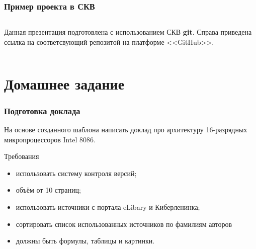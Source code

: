 \documentclass[aspectratio=169]{beamer}
\begin{document}
\begin{frame}
\frametitle{Пример проекта в СКВ}
\medskip
\begin{columns}
Данная презентация подготовлена с использованием СКВ \textbf{git}. Справа приведена ссылка на соответсвующий репозитой на платформе <<GitHub>>.
\end{columns}
\end{frame}

\section{Домашнее задание}

\begin{frame}
\frametitle{Подготовка доклада}
На основе созданного шаблона написать доклад про архитектуру 16-разрядных микропроцессоров Intel 8086.
\begin{exampleblock}{Требования}
\begin{itemize}
\item использовать систему контроля версий;
\item объём от 10 страниц;
\item использовать источники с портала eLibary и Киберленинка;
\item сортировать список использованных источников по фамилиям авторов
\item должны быть формулы, таблицы и картинки.
\end{itemize}
\end{exampleblock}
\end{frame}
\end{document}
